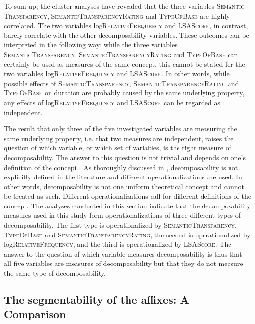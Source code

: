 To sum up, the cluster analyses have revealed that the three variables \textsc{Semantic-Transparency}, \textsc{SemanticTransparencyRating} and \textsc{TypeOfBase} are highly correlated. The two variables log\textsc{RelativeFrequency} and \textsc{LSAScore}, in contrast, barely correlate with the other decomposability variables.
These outcomes can be interpreted in the following way: while the three variables  \textsc{SemanticTransparency}, \textsc{SemanticTransparencyRating} and \textsc{TypeOfBase} can certainly be used as measures of the same concept, this cannot be stated for the two variables log\textsc{RelativeFrequency} and \textsc{LSAScore}. In other words,  while possible effects of \textsc{SemanticTransparency}, \textsc{SemanticTransparencyRating} and \textsc{TypeOfBase} on duration are probably caused by the same underlying property, any effects of log\textsc{RelativeFrequency} and \textsc{LSAScore} can be regarded as independent.


The result that only three of the five investigated variables are measuring the same underlying property, i.e. that two measures are independent, raises the question of which variable, or which set of variables, is the right measure of decomposability.
The answer to this question is not trivial and depends on one's definition of the concept . As thoroughly discussed in , decomposability is not explicitly defined in the literature and different operationalizations are used. In other words, decomposability is not one uniform theoretical concept and cannot be treated as such. Different operationalizations call for different definitions of the concept. 
The analyses conducted in this section indicate that the decomposability measures used in this study form operationalizations of three different types of decomposability. The first type is operationalized by \textsc{SemanticTransparency}, \textsc{TypeOfBase} and \textsc{SemanticTransparencyRating}, the second is operationalized by log\textsc{RelativeFrequency}, and the third is operationalized by \textsc{LSAScore}.
The answer to the question of which variable measures decomposability is thus that all five variables are measures of decomposability but that they do not measure the same type of decomposability. 

 

\subsection{The segmentability of the affixes: A Comparison}
\label{The decomposability of the four affixes: a comparison}


